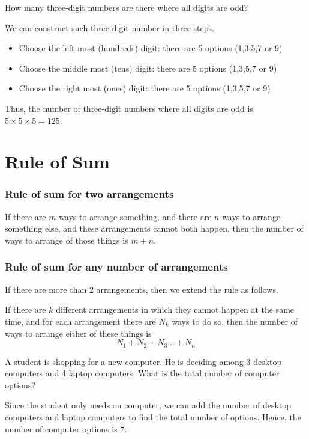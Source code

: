 \begin{frame}[t]
\begin{ex}
How many three-digit numbers are there where all digits are odd?
\end{ex} \pa
\begin{sol}
We can construct such three-digit number in three steps. \pa
\begin{itemize}
\item Choose the left most (hundreds) digit: there are 5 options (1,3,5,7 or 9) \pa
\item Choose the middle most (tens) digit: there are 5 options (1,3,5,7 or 9) \pa
\item Choose the right most (ones) digit: there are 5 options (1,3,5,7 or 9) \pa
\end{itemize}
Thus, the number of three-digit numbers where all digits are odd is $5 \times 5 \times 5 = 125$.
\end{sol}
\end{frame}


\section{Rule of Sum}
\frame{\sectionpage}

\begin{frame}
\frametitle{Rule of sum for two arrangements}
\begin{thm}{}{}
If there are $m$ ways to arrange something, and there are $n$ ways to arrange something else, and these arrangements cannot both happen, then the number of ways to arrange  of those things is $m + n$.
\end{thm}
\end{frame}

\begin{frame}
\frametitle{Rule of sum for any number of arrangements}
If there are more than 2 arrangements, then we extend the rule as follows.
\begin{thm}{}{}
If there are $k$ different arrangements in which they cannot happen at the same time, and for each arrangement there are $N_k$ ways to do so, then the number of ways to arrange either of these things is
\begin{equation} \label{eq:rule_of_addition}
N_1 + N_2 + N_3 \ldots + N_n
\end{equation}
\end{thm}
\end{frame}


\begin{frame}[t]
\begin{ex}
A student is shopping for a new computer. He is deciding among 3 desktop computers and 4 laptop computers. What is the total number of computer options?
\end{ex}
\begin{sol}
Since the student only needs on computer, we can add the number of desktop computers and laptop computers to find the total number of options. \pa Hence, the number of computer options is 7.
\end{sol}
\end{frame}



